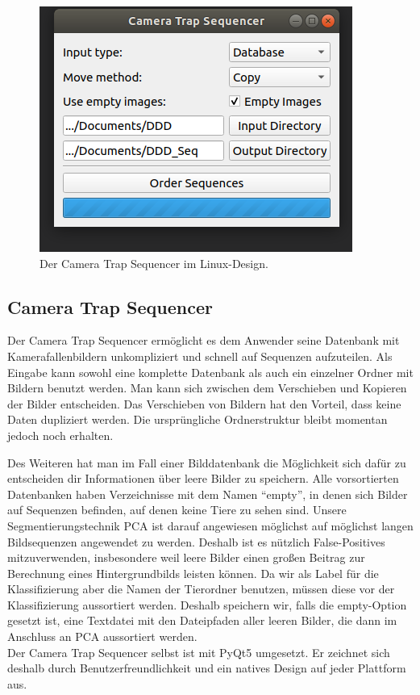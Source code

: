 \begin{figure}
	\centering
	\includegraphics[scale=0.5]{img/CameraTrapSequencer.png}
	\caption{Der Camera Trap Sequencer im Linux-Design.}
	\label{fig:SequencerGUI}
\end{figure}

\subsection{Camera Trap Sequencer}

Der Camera Trap Sequencer ermöglicht es dem Anwender seine Datenbank mit Kamerafallenbildern unkompliziert und schnell auf Sequenzen aufzuteilen. Als Eingabe kann sowohl eine komplette Datenbank als auch ein einzelner Ordner mit Bildern benutzt werden. Man kann sich zwischen dem Verschieben und Kopieren der Bilder entscheiden. Das Verschieben von Bildern hat den Vorteil, dass keine Daten dupliziert werden. Die ursprüngliche Ordnerstruktur bleibt momentan jedoch noch erhalten. 

Des Weiteren hat man im Fall einer Bilddatenbank die Möglichkeit sich dafür zu entscheiden dir Informationen über leere Bilder zu speichern. Alle vorsortierten Datenbanken haben Verzeichnisse mit dem Namen \enquote{empty}, in denen sich Bilder auf Sequenzen befinden, auf denen keine Tiere zu sehen sind. Unsere Segmentierungstechnik PCA ist darauf angewiesen möglichst auf möglichst langen Bildsequenzen angewendet zu werden. Deshalb ist es nützlich False-Positives mitzuverwenden, insbesondere weil leere Bilder einen großen Beitrag zur Berechnung eines Hintergrundbilds leisten können. Da wir als Label für die Klassifizierung aber die Namen der Tierordner benutzen, müssen diese vor der Klassifizierung aussortiert werden. Deshalb speichern wir, falls die empty-Option gesetzt ist, eine Textdatei mit den Dateipfaden aller leeren Bilder, die dann im Anschluss an PCA aussortiert werden. \\
Der Camera Trap Sequencer selbst ist mit PyQt5 umgesetzt. Er zeichnet sich deshalb durch Benutzerfreundlichkeit und ein natives Design auf jeder Plattform aus.
